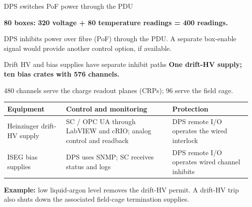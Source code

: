 \documentclass[aspectratio=169,11pt]{beamer}
\begin{document}
\begin{frame}{DPS switches PoF power through the PDU}
\centering

\par\medskip
\raggedright{}\par\medskip
\raggedright

\textbf{80 boxes: 320 voltage + 80 temperature readings = 400 readings.}\par\medskip
DPS inhibits power over fibre (PoF) through the PDU. A separate box-enable signal would provide another control option, if available.
\end{frame}

\begin{frame}{Drift HV and bias supplies have separate inhibit paths}
\textbf{One drift-HV supply; ten bias crates with 576 channels.}\par
480 channels serve the charge readout planes (CRPs); 96 serve the field cage.\par\bigskip
\renewcommand{\arraystretch}{1.35}
\begin{tabularx}{\textwidth}{@{}>{\RaggedRight\arraybackslash}p{2.1cm}>{\RaggedRight\arraybackslash}X>{\RaggedRight\arraybackslash}X@{}}
\toprule
\textbf{Equipment} & \textbf{Control and monitoring} & \textbf{Protection}\\\midrule
Heinzinger drift-HV supply & SC / OPC UA through LabVIEW and cRIO; analog control and readback & DPS remote I/O operates the wired interlock\\
ISEG bias supplies & DPS uses SNMP; SC receives status and logs & DPS remote I/O operates wired channel inhibits\\
\bottomrule
\end{tabularx}\par\bigskip
\textbf{Example:} low liquid-argon level removes the drift-HV permit. A drift-HV trip also shuts down the associated field-cage termination supplies.
\end{frame}
\end{document}
